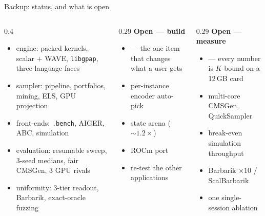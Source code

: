 \begin{frame}{Backup: status, and what is open}
  \begin{columns}[T]
    \begin{column}{0.4\textwidth}
      \begin{itemize}\small
        \item engine: packed kernels, scalar $+$ WAVE, \texttt{libgpap}, three language faces
        \item sampler: pipeline, portfolios, mining, ELS, GPU projection
        \item front-ends: \texttt{.bench}, AIGER, ABC, simulation
        \item evaluation: resumable sweep, 3-seed medians, fair CMSGen, 3 GPU rivals
        \item uniformity: 3-tier readout, Barbarik, exact-oracle fuzzing
      \end{itemize}
    \end{column}
    \begin{column}{0.29\textwidth}
      \textbf{Open --- build}
      \begin{itemize}\small
        \item {} --- the one item that changes what a user gets
        \item per-instance encoder auto-pick
        \item state arena (${\sim}1.2\times$)
        \item ROCm port 
        \item re-test the other applications
      \end{itemize}
    \end{column}
    \begin{column}{0.29\textwidth}
      \textbf{Open --- measure}
      \begin{itemize}\small
        \item {} --- every number is $K$-bound on a 12\,GB card
        \item multi-core CMSGen, QuickSampler
        \item break-even simulation throughput
        \item Barbarik $\times 10$ / ScalBarbarik
        \item one single-session ablation
      \end{itemize}
    \end{column}
  \end{columns}
\end{frame}

